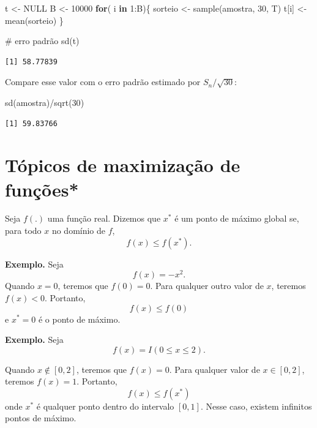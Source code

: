 \documentclass[
  letterpaper,
  DIV=11,
  numbers=noendperiod]{scrartcl}
\newenvironment{Shaded}{\begin{snugshade}}{\end{snugshade}}
\newcommand{\CommentTok}[1]{\textcolor[rgb]{0.37,0.37,0.37}{#1}}
\newcommand{\ConstantTok}[1]{\textcolor[rgb]{0.56,0.35,0.01}{#1}}
\newcommand{\ControlFlowTok}[1]{\textcolor[rgb]{0.00,0.23,0.31}{\textbf{#1}}}
\newcommand{\DecValTok}[1]{\textcolor[rgb]{0.68,0.00,0.00}{#1}}
\newcommand{\FunctionTok}[1]{\textcolor[rgb]{0.28,0.35,0.67}{#1}}
\newcommand{\NormalTok}[1]{\textcolor[rgb]{0.00,0.23,0.31}{#1}}
\newcommand{\OtherTok}[1]{\textcolor[rgb]{0.00,0.23,0.31}{#1}}
\newcommand{\SpecialCharTok}[1]{\textcolor[rgb]{0.37,0.37,0.37}{#1}}
\begin{document}
\begin{Shaded}
\begin{Highlighting}[]
\NormalTok{t }\OtherTok{\textless{}{-}} \ConstantTok{NULL}
\NormalTok{B }\OtherTok{\textless{}{-}} \DecValTok{10000}
\ControlFlowTok{for}\NormalTok{( i }\ControlFlowTok{in} \DecValTok{1}\SpecialCharTok{:}\NormalTok{B)\{ }
\NormalTok{sorteio }\OtherTok{\textless{}{-}} \FunctionTok{sample}\NormalTok{(amostra, }\DecValTok{30}\NormalTok{, T)}
\NormalTok{t[i] }\OtherTok{\textless{}{-}} \FunctionTok{mean}\NormalTok{(sorteio)}
\NormalTok{\}}

\CommentTok{\# erro padrão}
\FunctionTok{sd}\NormalTok{(t)}
\end{Highlighting}
\end{Shaded}

\begin{verbatim}
[1] 58.77839
\end{verbatim}

Compare esse valor com o erro padrão estimado por \(S_n/\sqrt{30}\):

\begin{Shaded}
\begin{Highlighting}[]
\FunctionTok{sd}\NormalTok{(amostra)}\SpecialCharTok{/}\FunctionTok{sqrt}\NormalTok{(}\DecValTok{30}\NormalTok{)}
\end{Highlighting}
\end{Shaded}

\begin{verbatim}
[1] 59.83766
\end{verbatim}

\section{Tópicos de maximização de
funções*}\label{tuxf3picos-de-maximizauxe7uxe3o-de-funuxe7uxf5es}

Seja \(f(.)\) uma função real. Dizemos que \(x^*\) é um ponto de máximo
global se, para todo \(x\) no domínio de \(f\), \[f(x)\leq f(x^*).\]

\textbf{Exemplo.} Seja \[f(x)= -x^2.\] Quando \(x=0\), teremos que
\(f(0)=0\). Para qualquer outro valor de \(x\), teremos \(f(x)<0\).
Portanto, \[f(x)\leq f(0)\] e \(x^*=0\) é o ponto de máximo.

\textbf{Exemplo.} Seja \[f(x)= I(0\leq x \leq 2).\]

Quando \(x\notin[0,2]\), teremos que \(f(x)=0\). Para qualquer valor de
\(x\in[0,2]\), teremos \(f(x)=1\). Portanto, \[f(x)\leq f(x^*)\] onde
\(x^*\) é qualquer ponto dentro do intervalo \([0,1]\). Nesse caso,
existem infinitos pontos de máximo.
\end{document}
